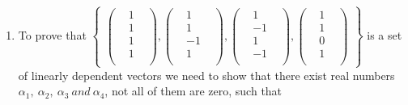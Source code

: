 \documentclass[45pt]{article}
\begin{document}
$ $ \\
\Large{}
\renewcommand{\labelenumii}{\arabic{enumii}}
\begin{enumerate}
  \item To prove that 
$\begin{Bmatrix}
    \begin{pmatrix}
      &1&\\&1&\\ &1&\\&1&\\
    \end{pmatrix},
  
    \begin{pmatrix}
      &1&\\&1&\\ &-1&\\&1&\\
    \end{pmatrix},
    \begin{pmatrix}
      &1&\\&-1&\\ &1&\\&-1&\\
    \end{pmatrix},
    \begin{pmatrix}
      &1&\\&1&\\ &0&\\&1&\\
    \end{pmatrix}
  \end{Bmatrix}$ is a set of linearly dependent vectors we need to 
  show that there exist real numbers $\alpha _1,~ \alpha_2,~ \alpha_3~ and~ \alpha_4$, not all of them are zero, such that \\


\end{enumerate}
\end{document}

